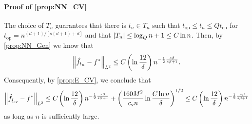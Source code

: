 \paragraph{Proof of \cref{prop:NN_CV}}
The choice of $T_n$ guarantees that there is $t_n \in T_n$
such that $t_{\mathrm{op}} \leq t_n \leq Q t_{\mathrm{op}}$ for $t_{\mathrm{op}} = n^{(d+1)/ [s(d+1)+d]}$
and that $\abs{T_n} \leq \log_Q n + 1 \leq C\ln n$.
Then, by \cref{prop:NN_Gen} we know that
\begin{align*}
  \norm{\hat{f}_{t_n} - f^*}_{L^2} \leq C \left( \ln\frac{12}{\delta} \right) n^{-\frac{1}{2}\frac{s\beta}{s\beta + 1}}.
\end{align*}
Consequently, by \cref{prop:E_CV}, we conclude that
\begin{align*}
  \norm{\hat{f}_{\hat{t}_{\mathrm{cv}}} - f^*}_{L^2}
  \leq C \left( \ln\frac{12}{\delta} \right) n^{-\frac{1}{2}\frac{s\beta}{s\beta + 1}}
  + \left( \frac{160 M^2}{c_{\mathrm{v}} n} \ln \frac{C \ln n}{\delta} \right)^{1/2}
  \leq C \left( \ln\frac{12}{\delta} \right) n^{-\frac{1}{2}\frac{s\beta}{s\beta + 1}}
\end{align*}
as long as $n$ is sufficiently large.
